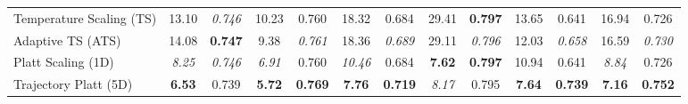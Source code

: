 \begin{table}[t]
{\begin{tabular}{l cccccccccccc}
Temperature Scaling (TS) & 13.10 & \textit{0.746} & 10.23 & 0.760 & 18.32 & 0.684 & 29.41 & \textbf{0.797} & 13.65 & 0.641 & 16.94 & 0.726 \\
Adaptive TS (ATS) & 14.08 & \textbf{0.747} & 9.38 & \textit{0.761} & 18.36 & \textit{0.689} & 29.11 & \textit{0.796} & 12.03 & \textit{0.658} & 16.59 & \textit{0.730} \\
Platt Scaling (1D) & \textit{8.25} & \textit{0.746} & \textit{6.91} & 0.760 & \textit{10.46} & 0.684 & \textbf{7.62} & \textbf{0.797} & 10.94 & 0.641 & \textit{8.84} & 0.726 \\
Trajectory Platt (5D) & \textbf{6.53} & 0.739 & \textbf{5.72} & \textbf{0.769} & \textbf{7.76} & \textbf{0.719} & \textit{8.17} & 0.795 & \textbf{7.64} & \textbf{0.739} & \textbf{7.16} & \textbf{0.752} \\
\bottomrule
\end{tabular}%
}
\end{table}
